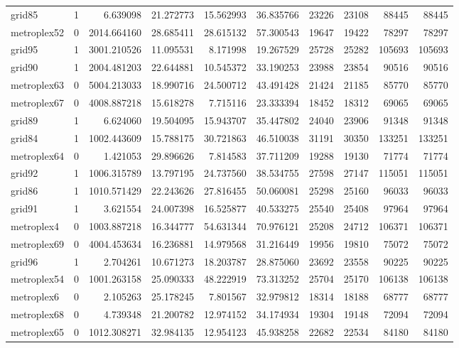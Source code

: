\begin{longtable}{|l|r|r|r|r|r|r|r|r|r|}
grid85 & 1 & 6.639098 & 21.272773 & 15.562993 & 36.835766 & 23226 & 23108 & 88445 & 88445 \\
metroplex52 & 0 & 2014.664160 & 28.685411 & 28.615132 & 57.300543 & 19647 & 19422 & 78297 & 78297 \\
grid95 & 1 & 3001.210526 & 11.095531 & 8.171998 & 19.267529 & 25728 & 25282 & 105693 & 105693 \\
grid90 & 1 & 2004.481203 & 22.644881 & 10.545372 & 33.190253 & 23988 & 23854 & 90516 & 90516 \\
metroplex63 & 0 & 5004.213033 & 18.990716 & 24.500712 & 43.491428 & 21424 & 21185 & 85770 & 85770 \\
metroplex67 & 0 & 4008.887218 & 15.618278 & 7.715116 & 23.333394 & 18452 & 18312 & 69065 & 69065 \\
grid89 & 1 & 6.624060 & 19.504095 & 15.943707 & 35.447802 & 24040 & 23906 & 91348 & 91348 \\
grid84 & 1 & 1002.443609 & 15.788175 & 30.721863 & 46.510038 & 31191 & 30350 & 133251 & 133251 \\
metroplex64 & 0 & 1.421053 & 29.896626 & 7.814583 & 37.711209 & 19288 & 19130 & 71774 & 71774 \\
grid92 & 1 & 1006.315789 & 13.797195 & 24.737560 & 38.534755 & 27598 & 27147 & 115051 & 115051 \\
grid86 & 1 & 1010.571429 & 22.243626 & 27.816455 & 50.060081 & 25298 & 25160 & 96033 & 96033 \\
grid91 & 1 & 3.621554 & 24.007398 & 16.525877 & 40.533275 & 25540 & 25408 & 97964 & 97964 \\
metroplex4 & 0 & 1003.887218 & 16.344777 & 54.631344 & 70.976121 & 25208 & 24712 & 106371 & 106371 \\
metroplex69 & 0 & 4004.453634 & 16.236881 & 14.979568 & 31.216449 & 19956 & 19810 & 75072 & 75072 \\
grid96 & 1 & 2.704261 & 10.671273 & 18.203787 & 28.875060 & 23692 & 23558 & 90225 & 90225 \\
metroplex54 & 0 & 1001.263158 & 25.090333 & 48.222919 & 73.313252 & 25704 & 25170 & 106138 & 106138 \\
metroplex6 & 0 & 2.105263 & 25.178245 & 7.801567 & 32.979812 & 18314 & 18188 & 68777 & 68777 \\
metroplex68 & 0 & 4.739348 & 21.200782 & 12.974152 & 34.174934 & 19304 & 19148 & 72094 & 72094 \\
metroplex65 & 0 & 1012.308271 & 32.984135 & 12.954123 & 45.938258 & 22682 & 22534 & 84180 & 84180 \\

\end{longtable}
